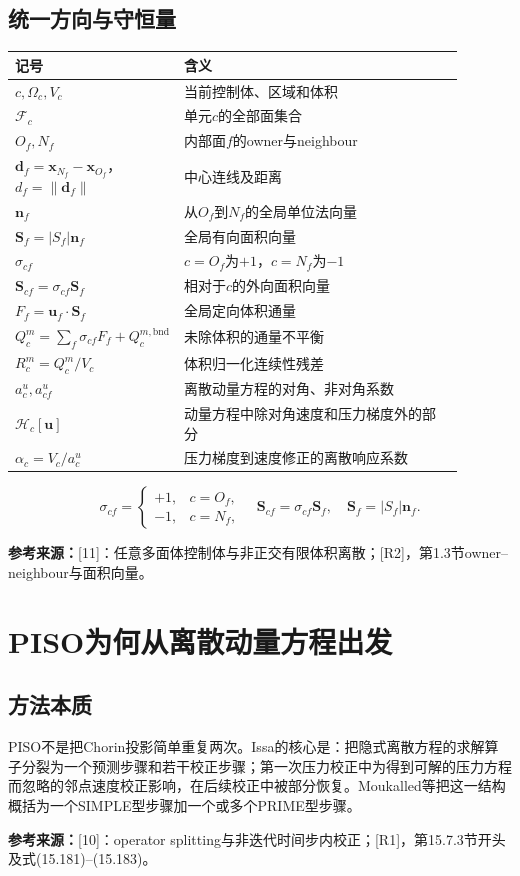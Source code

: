 \documentclass[UTF8,12pt,a4paper]{ctexart}
\numberwithin{equation}{section}
\newcommand{\Issa}{\textnormal{[10]}}
\newcommand{\Jasak}{\textnormal{[11]}}
\newcommand{\Rone}{\textnormal{[R1]}}
\newcommand{\Rtwo}{\textnormal{[R2]}}
\newcommand{\source}[1]{\par\smallskip\noindent\colorbox{sourcebg}{%
  \parbox{0.955\linewidth}{\footnotesize\color{sourcegray}\textbf{参考来源：}#1}}\par\smallskip}
\begin{document}
\subsection*{统一方向与守恒量}
\begin{longtable}{>{\centering\arraybackslash}p{0.22\linewidth}p{0.67\linewidth}}
\toprule
记号 & 含义\\
\midrule
$c,\Omega_c,V_c$ & 当前控制体、区域和体积\\
$\mathcal F_c$ & 单元$c$的全部面集合\\
$O_f,N_f$ & 内部面$f$的owner与neighbour\\
$\bm d_f=\bm x_{N_f}-\bm x_{O_f}$，$d_f=\lVert\bm d_f\rVert$ & 中心连线及距离\\
$\bm n_f$ & 从$O_f$到$N_f$的全局单位法向量\\
$\bm S_f=|S_f|\bm n_f$ & 全局有向面积向量\\
$\sigma_{cf}$ & $c=O_f$为$+1$，$c=N_f$为$-1$\\
$\bm S_{cf}=\sigma_{cf}\bm S_f$ & 相对于$c$的外向面积向量\\
$F_f=\bm u_f\cdot\bm S_f$ & 全局定向体积通量\\
$Q_c^m=\sum_f\sigma_{cf}F_f+Q_c^{m,\mathrm{bnd}}$ & 未除体积的通量不平衡\\
$R_c^m=Q_c^m/V_c$ & 体积归一化连续性残差\\
$a_c^u,a_{cf}^u$ & 离散动量方程的对角、非对角系数\\
$\mathcal H_c[\bm u]$ & 动量方程中除对角速度和压力梯度外的部分\\
$\alpha_c=V_c/a_c^u$ & 压力梯度到速度修正的离散响应系数\\
\bottomrule
\end{longtable}
\begin{equation}
  \boxed{\sigma_{cf}=\begin{cases}+1,&c=O_f,\\-1,&c=N_f,\end{cases}
  \quad\bm S_{cf}=\sigma_{cf}\bm S_f,\quad\bm S_f=|S_f|\bm n_f.}
  \label{eq:orientation}
\end{equation}
\source{\Jasak：任意多面体控制体与非正交有限体积离散；\Rtwo，第1.3节owner--neighbour与面积向量。}

\section{PISO为何从离散动量方程出发}
\subsection{方法本质}
PISO不是把Chorin投影简单重复两次。Issa的核心是：把隐式离散方程的求解算子分裂为一个预测步骤和若干校正步骤；第一次压力校正中为得到可解的压力方程而忽略的邻点速度校正影响，在后续校正中被部分恢复。Moukalled等把这一结构概括为一个SIMPLE型步骤加一个或多个PRIME型步骤。
\source{\Issa：operator splitting与非迭代时间步内校正；\Rone，第15.7.3节开头及式(15.181)--(15.183)。}
\end{document}
